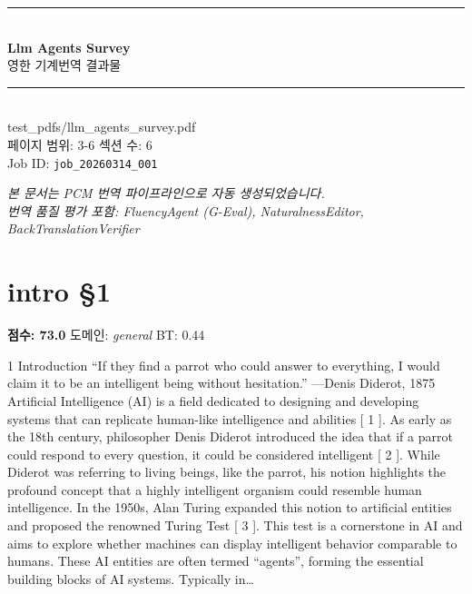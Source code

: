 \documentclass[11pt,a4paper,oneside]{memoir}
\begin{document}
\begin{titlingpage}
\vspace*{3cm}
{\sffamily
  \begin{center}
    {\color{ChapterBlue}\rule{\textwidth}{2pt}}\\[1em]
    {\Huge\bfseries Llm Agents Survey}\\[0.8em]
    {\large 영한 기계번역 결과물}\\[0.5em]
    {\color{ChapterBlue}\rule{\textwidth}{1pt}}\\[2em]
    {\normalsize\ttfamily test\_pdfs/llm\_agents\_survey.pdf}\\[0.3em]
    {\small 페이지 범위: 3-6 \quad 섹션 수: 6}\\[0.5em]
    {\small\color{gray} Job ID: \texttt{job\_20260314\_001}}
  \end{center}
}
\vfill
{\small\color{gray} \textit{본 문서는 PCM 번역 파이프라인으로 자동 생성되었습니다.\\
번역 품질 평가 포함: FluencyAgent (G-Eval), NaturalnessEditor, BackTranslationVerifier}}
\end{titlingpage}

\clearpage
\tableofcontents*
\clearpage

\section{intro §1}
\noindent \textbf{\color{ScoreGreen}점수: 73.0} \quad 도메인: \textit{general}  \quad \textcolor{ScoreRed}{BT: 0.44}
\vspace{0.4em}

\begin{tcolorbox}[origstyle]
\small 1 Introduction “If they find a parrot who could answer to everything, I would claim it to be an intelligent being without hesitation.” —Denis Diderot, 1875 Artificial Intelligence (AI) is a field dedicated to designing and developing systems that can replicate human-like intelligence and abilities [ 1 ]. As early as the 18th century, philosopher Denis Diderot introduced the idea that if a parrot could respond to every question, it could be considered intelligent [ 2 ]. While Diderot was referring to living beings, like the parrot, his notion highlights the profound concept that a highly intelligent organism could resemble human intelligence. In the 1950s, Alan Turing expanded this notion to artificial entities and proposed the renowned Turing Test [ 3 ]. This test is a cornerstone in AI and aims to explore whether machines can display intelligent behavior comparable to humans. These AI entities are often termed “agents”, forming the essential building blocks of AI systems. Typically in\ldots
\end{tcolorbox}
\vspace{0.3em}
\end{document}
